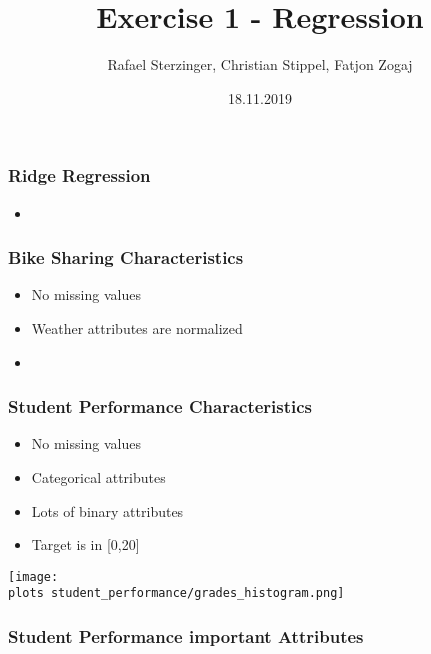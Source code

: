 \documentclass[aspectratio=169]{beamer}
\title[Your Short Title]{Exercise 1 - Regression}
\author{Rafael Sterzinger, Christian Stippel, Fatjon Zogaj}
\institute{Machine Learning}
\date{18.11.2019}
\def \plots {./plots/}
\begin{document}

\begin{frame}
  \titlepage
\end{frame}

\begin{frame}
\frametitle{Ridge Regression}
\begin{itemize}
\item 
\end{itemize}
\end{frame}

\begin{frame}{}
\frametitle{Bike Sharing Characteristics}
\begin{itemize}
\item No missing values
\item Weather attributes are normalized
\item 
\end{itemize}
\end{frame}


\begin{frame}{}
\frametitle{Student Performance Characteristics}
\begin{minipage}{0.45\textwidth}
\begin{itemize}
\item No missing values
\item Categorical attributes
\item Lots of binary attributes
\item Target is in [0,20]
\end{itemize}
\end{minipage}
\begin{minipage}{0.5\textwidth}
    \texttt{[image: \\plots student\_performance/grades\_histogram.png]}
\end{minipage}
\end{frame}

\begin{frame}{}
\frametitle{Student Performance important Attributes}
\end{frame}
\end{document}
